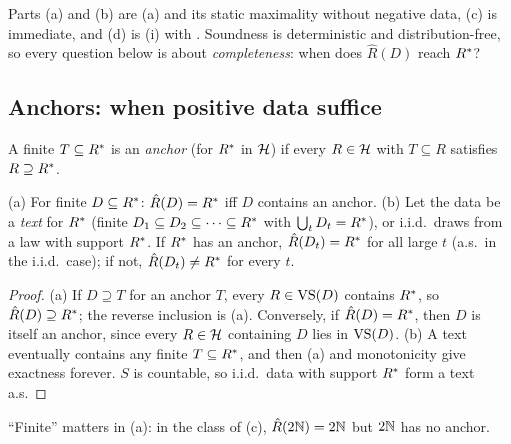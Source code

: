 \noindent Parts (a) and (b) are (a) and its static maximality without negative data, (c) is immediate, and (d) is (i) with . Soundness is deterministic and distribution-free, so every question below is about \emph{completeness}: when does $\hat R(D)$ reach $R^{*}$?

\subsection{Anchors: when positive data suffice}\label{sec:imitation:anchors}

\begin{definition}[Anchor]\label{def:imitation:anchor}
A finite $T\subseteq R^{*}$ is an \emph{anchor} (for $R^{*}$ in $\mathcal{H}$) if every $R\in\mathcal{H}$ with $T\subseteq R$ satisfies $R\supseteq R^{*}$.
\end{definition}

\begin{theorem}\label{thm:imitation:anchor}
\textup{(a)} For finite $D\subseteq R^{*}$: $\hat R(D)=R^{*}$ iff $D$ contains an anchor.
\textup{(b)} Let the data be a \emph{text} for $R^{*}$ (finite $D_1\subseteq D_2\subseteq\cdots\subseteq R^{*}$ with $\bigcup_tD_t=R^{*}$), or i.i.d.\ draws from a law with support $R^{*}$. If $R^{*}$ has an anchor, $\hat R(D_t)=R^{*}$ for all large $t$ (a.s.\ in the i.i.d.\ case); if not, $\hat R(D_t)\neq R^{*}$ for every $t$.
\end{theorem}

\begin{proof}
(a) If $D\supseteq T$ for an anchor $T$, every $R\in\mathrm{VS}(D)$ contains $R^{*}$, so $\hat R(D)\supseteq R^{*}$; the reverse inclusion is (a). Conversely, if $\hat R(D)=R^{*}$, then $D$ is itself an anchor, since every $R\in\mathcal{H}$ containing $D$ lies in $\mathrm{VS}(D)$. (b) A text eventually contains any finite $T\subseteq R^{*}$, and then (a) and monotonicity give exactness forever. $S$ is countable, so i.i.d.\ data with support $R^{*}$ form a text a.s.
\end{proof}

``Finite'' matters in (a): in the class of (c), $\hat R(2\mathbb{N})=2\mathbb{N}$ but $2\mathbb{N}$ has no anchor.

